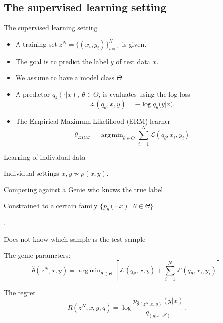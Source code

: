 \documentclass[aspectratio=169]{beamer}
\newcommand{\SubItem}[1]{
    {\setlength\itemindent{15pt} \item[-] #1}
}
\DeclareMathOperator*{\argmin}{arg\,min}
\begin{document}
\subsection{The supervised learning setting}
\begin{frame}{The supervised learning setting}
\begin{itemize}
\setlength\itemsep{1.5em}
\item A training set $z^N = \{(x_i,y_i)\}_{i=1}^N$ is given. 
\item The goal is to predict the label $y$ of test data $x$. 
\item We assume to have a model class $\Theta$.
\item A predictor $q_{\theta}(\cdot|x), \ \theta \in \Theta$, is evaluates using the log-loss  
    \begin{equation}
    \mathcal{L}(q_\theta, x, y) = -\log {q_\theta(y|x}).
    \end{equation}
\item The Empirical Maximum Likelihood (ERM) learner
\begin{equation}
    \theta_{ERM} = \argmin_{\theta \in \Theta} \sum_{i=1}^N \mathcal{L}(q_\theta, x_i, y_i)
\end{equation}
\end{itemize}
\end{frame}



\begin{frame}{Learning of individual data}
\begin{itemize}
\setlength\itemsep{0.5em}
\item Individual settings $x,y \not\sim p(x,y)$.  
\item Competing against a Genie who knows the true label
\SubItem {Constrained to a certain family $\{p_{\theta}(\cdot|x), \ \theta \in \Theta\}$}.
\SubItem {Does not know which sample is the test sample}
\item The genie parameters:
    \begin{equation}
        \hat{\theta}(z^N,x,y) = \argmin_{\theta \in \Theta}\left[\mathcal{L}(q_\theta, x, y) +  \sum_{i=1}^N \mathcal{L}(q_\theta, x_i, y_i) \right]
    \end{equation}
\item The regret
    \begin{equation}
        R(z^N,x,y,q) = \log \frac{p_{\hat{\theta}(z^N,x,y)}(y|x)}{q_(y|x;z^N)}.
    \end{equation}
\end{itemize}
\end{frame}
\end{document}
